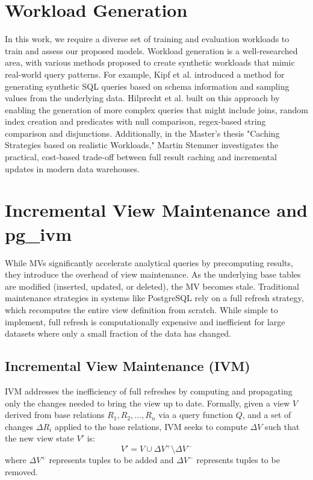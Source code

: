 \section{Workload Generation}
\label{sec:workload_generation}
In this work, we require a diverse set of training and evaluation workloads to train and assess our proposed models. Workload generation is a well-researched area, with various methods proposed to create synthetic workloads that mimic real-world query patterns. For example, Kipf et al. \cite{kipf2018learned} introduced a method for generating synthetic SQL queries based on schema information and sampling values from the underlying data. Hilprecht et al. \cite{hilprecht2022zero} built on this approach by enabling the generation of more complex queries that might include joins, random index creation and predicates with null comparison, regex-based string comparison and disjunctions. Additionally, in the Master's thesis "Caching Strategies based on realistic Workloads," Martin Stemmer \cite{Stemmer2025} investigates the practical, cost-based trade-off between full result caching and incremental updates in modern data warehouses.

\section{Incremental View Maintenance and pg\_ivm}
\label{sec:pg_ivm}

While \ac{MV}s significantly accelerate analytical queries by precomputing results, they introduce the overhead of view maintenance. As the underlying base tables are modified (inserted, updated, or deleted), the \ac{MV} becomes stale. Traditional maintenance strategies in systems like PostgreSQL rely on a full refresh strategy, which recomputes the entire view definition from scratch. While simple to implement, full refresh is computationally expensive and inefficient for large datasets where only a small fraction of the data has changed.

\subsection{Incremental View Maintenance (IVM)}
\label{subsec:ivm_theory}
\ac{IVM} addresses the inefficiency of full refreshes by computing and propagating only the changes needed to bring the view up to date. Formally, given a view $V$ derived from base relations $R_1, R_2, \dots, R_n$ via a query function $Q$, and a set of changes $\Delta R_i$ applied to the base relations, \ac{IVM} seeks to compute $\Delta V$ such that the new view state $V'$ is:
$$
V' = V \cup \Delta V^+ \setminus \Delta V^-
$$
where $\Delta V^+$ represents tuples to be added and $\Delta V^-$ represents tuples to be removed.

